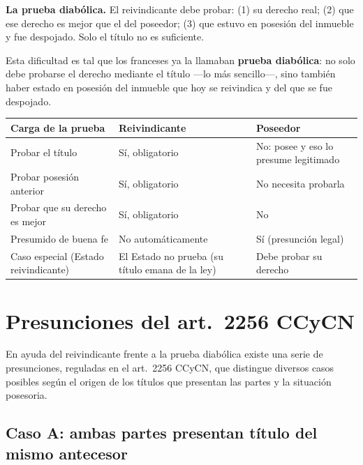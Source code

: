 \documentclass[12pt,oneside]{book}
\begin{document}
\begin{important}
\textbf{La prueba diabólica.} El reivindicante debe probar: (1) su derecho real; (2) que ese derecho es mejor que el del poseedor; (3) que estuvo en posesión del inmueble y fue despojado. Solo el título no es suficiente.
\end{important}

Esta dificultad es tal que los franceses ya la llamaban \textbf{prueba diabólica}: no solo debe probarse el derecho mediante el título ---lo más sencillo---, sino también haber estado en posesión del inmueble que hoy se reivindica y del que se fue despojado.

\begin{table}[H]
\centering
\small
\begin{tabularx}{\textwidth}{
    >{\raggedright\arraybackslash}p{}
    >{\raggedright\arraybackslash}X
    >{\raggedright\arraybackslash}X
}
\toprule
\textbf{Carga de la prueba} & \textbf{Reivindicante} & \textbf{Poseedor} \\
\midrule
Probar el título & Sí, obligatorio & No: posee y eso lo presume legitimado \\
Probar posesión anterior & Sí, obligatorio & No necesita probarla \\
Probar que su derecho es mejor & Sí, obligatorio & No \\
Presumido de buena fe & No automáticamente & Sí (presunción legal) \\
Caso especial (Estado reivindicante) & El Estado no prueba (su título emana de la ley) & Debe probar su derecho \\
\bottomrule
\end{tabularx}
\end{table}

\section{Presunciones del art.\ 2256 CCyCN}

En ayuda del reivindicante frente a la prueba diabólica existe una serie de presunciones, reguladas en el art.\ 2256 CCyCN, que distingue diversos casos posibles según el origen de los títulos que presentan las partes y la situación posesoria.

\subsection{Caso A: ambas partes presentan título del mismo antecesor}
\end{document}
